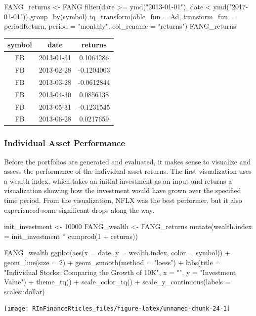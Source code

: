 \begin{Schunk}
\begin{Sinput}
FANG_returns <- FANG %
    filter(date >= ymd("2013-01-01"),
           date <  ymd("2017-01-01")) %
    group_by(symbol) %
    tq_transform(ohlc_fun = Ad,
                 transform_fun = periodReturn,
                 period = "monthly",
                 col_rename = "returns")
FANG_returns
\end{Sinput}
\end{Schunk}

\begin{tabular}{ccc}
\toprule
symbol & date & returns\\
\midrule
FB & 2013-01-31 & 0.1064286\\
FB & 2013-02-28 & -0.1204003\\
FB & 2013-03-28 & -0.0612844\\
FB & 2013-04-30 & 0.0856138\\
FB & 2013-05-31 & -0.1231545\\
FB & 2013-06-28 & 0.0217659\\
\bottomrule
\end{tabular}

\hspace{20 mm}

\subsubsection{Individual Asset
Performance}\label{individual-asset-performance}

Before the portfolios are generated and evaluated, it makes sense to
visualize and assess the performance of the individual asset returns.
The first visualization uses a wealth index, which takes an initial
investment as an input and returns a visualization showing how the
investment would have grown over the specified time period. From the
visualization, NFLX was the best performer, but it also experienced some
significant drops along the way.

\begin{Schunk}
\begin{Sinput}
init_investment <- 10000
FANG_wealth <- FANG_returns %
    mutate(wealth.index = init_investment * cumprod(1 + returns))

FANG_wealth %
    ggplot(aes(x = date, y = wealth.index, color = symbol)) +
    geom_line(size = 2) +
    geom_smooth(method = "loess") +
    labs(title = "Individual Stocks: Comparing the Growth of 10K",
         x = "", y = "Investment Value") +
    theme_tq() +
    scale_color_tq() +
    scale_y_continuous(labels = scales::dollar)
\end{Sinput}


\begin{center}\texttt{[image: RInFinanceRticles\_files/figure-latex/unnamed-chunk-24-1]} \end{center}

\end{Schunk}

